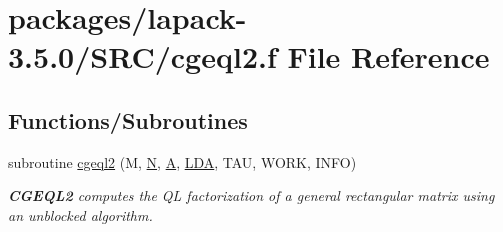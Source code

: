 \hypertarget{cgeql2_8f}{}\section{packages/lapack-\/3.5.0/\+S\+R\+C/cgeql2.f File Reference}
\label{cgeql2_8f}
\subsection*{Functions/\+Subroutines}
\begin{DoxyCompactItemize}
\item 
subroutine \hyperlink{group__complexGEcomputational_ga836bdb9b249392a6b4d70ba1e688b247}{cgeql2} (M, \hyperlink{polmisc_8c_a0240ac851181b84ac374872dc5434ee4}{N}, \hyperlink{classA}{A}, \hyperlink{example__user_8c_ae946da542ce0db94dced19b2ecefd1aa}{L\+D\+A}, T\+A\+U, W\+O\+R\+K, I\+N\+F\+O)
\begin{DoxyCompactList}\small\item\em {\bfseries C\+G\+E\+Q\+L2} computes the Q\+L factorization of a general rectangular matrix using an unblocked algorithm. \end{DoxyCompactList}\end{DoxyCompactItemize}
